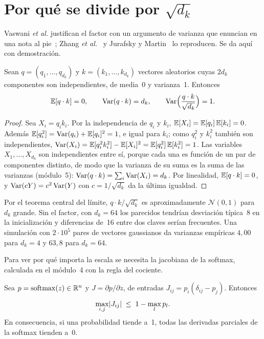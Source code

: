 \section{Por qué se divide por \texorpdfstring{$\sqrt{d_k}$}{raíz de dk}}
\label{sec:escalado}

Vaswani \emph{et al.} justifican el factor con un argumento de varianza que enuncian en una nota al pie~\cite[§3.2.1, nota~4]{vaswani}; Zhang \emph{et al.}~\cite[§11.3.3]{d2l} y Jurafsky y Martin~\cite[§7.1.1]{jm3} lo reproducen. Se da aquí con demostración.

\begin{teorema}\label{teo:varianza}
Sean $q=(q_1,\dots,q_{d_k})$ y $k=(k_1,\dots,k_{d_k})$ vectores aleatorios cuyas $2d_k$ componentes son independientes, de media~0 y varianza~1. Entonces
\[
\mathbb{E}[q\cdot k]=0,\qquad \operatorname{Var}(q\cdot k)=d_k,\qquad \operatorname{Var}\Bigl(\frac{q\cdot k}{\sqrt{d_k}}\Bigr)=1 .
\]
\end{teorema}

\begin{proof}
Sea $X_i=q_ik_i$. Por la independencia de $q_i$ y $k_i$, $\mathbb{E}[X_i]=\mathbb{E}[q_i]\,\mathbb{E}[k_i]=0$. Además $\mathbb{E}[q_i^{2}]=\operatorname{Var}(q_i)+\mathbb{E}[q_i]^{2}=1$, e igual para $k_i$; como $q_i^{2}$ y $k_i^{2}$ también son independientes, $\operatorname{Var}(X_i)=\mathbb{E}[q_i^{2}k_i^{2}]-\mathbb{E}[X_i]^{2}=\mathbb{E}[q_i^{2}]\,\mathbb{E}[k_i^{2}]=1$. Las variables $X_1,\dots,X_{d_k}$ son independientes entre sí, porque cada una es función de un par de componentes distinto, de modo que la varianza de su suma es la suma de las varianzas (módulo~5): $\operatorname{Var}(q\cdot k)=\sum_i\operatorname{Var}(X_i)=d_k$. Por linealidad, $\mathbb{E}[q\cdot k]=0$, y $\operatorname{Var}(cY)=c^{2}\operatorname{Var}(Y)$ con $c=1/\sqrt{d_k}$ da la última igualdad.
\end{proof}

Por el teorema central del límite, $q\cdot k/\sqrt{d_k}$ es aproximadamente $\mathcal N(0,1)$ para $d_k$ grande. Sin el factor, con $d_k=64$ los parecidos tendrían desviación típica~8 en la inicialización y diferencias de~16 entre dos claves serían frecuentes. Una simulación con $2\cdot 10^{5}$ pares de vectores gaussianos da varianzas empíricas $4{,}00$ para $d_k=4$ y $63{,}8$ para $d_k=64$.

Para ver por qué importa la escala se necesita la jacobiana de la softmax, calculada en el módulo~4 con la regla del cociente.

\begin{proposicion}\label{prop:saturacion}
Sea $p=\operatorname{softmax}(z)\in\mathbb{R}^{n}$ y $J=\partial p/\partial z$, de entradas $J_{ij}=p_i(\delta_{ij}-p_j)$. Entonces
\[
\max_{i,j}\lvert J_{ij}\rvert\;\le\;1-\max_{l}p_l .
\]
En consecuencia, si una probabilidad tiende a~1, todas las derivadas parciales de la softmax tienden a~0.
\end{proposicion}

